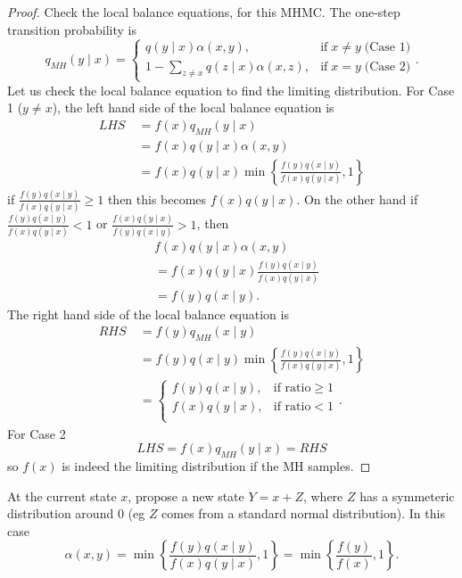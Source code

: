 \begin{proof}
    Check the local balance equations, for this MHMC. The one-step transition probability is
    \[
        q_{MH} (y \mid x) = \left\{
        \begin{matrix}
            q(y \mid x) \alpha (x,y) ,                     & \text{if} \; x \neq y \; \text{(Case 1)} \\
            1 - \sum_{z \neq x} q(z \mid x) \alpha (x,z) , & \text{if} \; x = y \; \text{(Case 2)}
        \end{matrix}
        \right. .
    \]
    Let us check the local balance equation to find the limiting distribution. For Case 1 ($y \neq x$), the left hand side of the local balance equation is
    \begin{align*}
        LHS \
         & = f(x) q_{MH} (y \mid x)        \\
         & = f(x) q(y \mid x) \alpha (x,y) \\
         & = f(x) q(y \mid x) \min \left\{
        \frac{f(y) q(x \mid y)}{f(x) q(y \mid x)} , 1
        \right\}
    \end{align*}
    if $\frac{f(y) q(x \mid y)}{f(x) q(y \mid x)} \geq 1$ then this becomes $f(x) q(y \mid x)$. On the other hand if $\frac{f(y) q(x \mid y)}{f(x) q(y \mid x)} < 1$ or $\frac{f(x) q(y \mid x)}{f(y) q(x \mid y)} > 1$, then
    \begin{align*}
         & f(x) q(y \mid x) \alpha (x,y)                                \\
         & = f(x) q(y \mid x) \frac{f(y) q(x \mid y)}{f(x) q(y \mid x)} \\
         & = f(y) q(x \mid y).
    \end{align*}
    The right hand side of the local balance equation is
    \begin{align*}
        RHS \
         & = f(y) q_{MH} (x \mid y)        \\
         & = f(y) q(x \mid y) \min \left\{
        \frac{f(y) q(x \mid y)}{f(x) q(y \mid x)} , 1
        \right\}                           \\
         & = \left\{
        \begin{matrix}
            f(y) q(x \mid y) , & \text{if ratio} \geq 1 \\
            f(x) q(y \mid x) , & \text{if ratio} < 1    \\
        \end{matrix}
        \right. .
    \end{align*}
    For Case 2
    \[
        LHS = f(x) q_{MH} (y \mid x) = RHS
    \]
    so $f(x)$ is indeed the limiting distribution if the MH samples.
\end{proof}

\begin{exam} \label{exam: MC_samp_1}
    At the current state $x$, propose a new state $Y = x + Z$, where $Z$ has a symmeteric distribution around $0$ (eg $Z$ comes from a standard normal distribution). In this case
    \[
        \alpha (x,y) = \min \left\{
        \frac{f(y) q(x \mid y)}{f(x) q(y \mid x)} , 1
        \right\} = \min \left\{
        \frac{f(y)}{f(x)} , 1
        \right\} .
    \]
\end{exam}